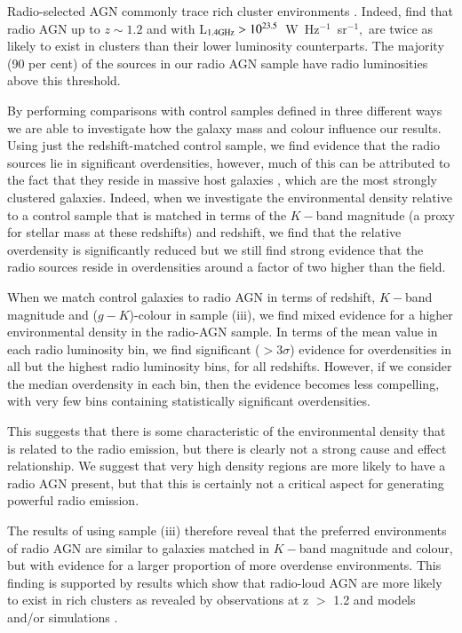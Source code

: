 Radio-selected AGN commonly trace rich cluster environments \citep[e.g.][]{best2007,karouzos2014a}. Indeed, \citet{magliocchetti2018} find that radio AGN up to $z \sim 1.2$ and with L$_{1.4 \rm{GHz} } > 10^{23.5}$~W~Hz$^{-1}$~sr$^{-1},$ are twice as likely to exist in clusters than their lower luminosity counterparts. The majority (90 per cent) of the sources in our radio AGN sample have radio luminosities above this threshold.  

By performing comparisons with control samples defined in three different ways we are able to investigate how the galaxy mass and colour influence our results. Using just the redshift-matched control sample, we find evidence that the radio sources lie in significant overdensities, however, much of this can be attributed to the fact that they reside in massive host galaxies \citep{jarvis2001,mclure2004,seymour2007}, which are the most strongly clustered galaxies. Indeed, when we investigate the environmental density relative to a control sample that is matched in terms of the $K-$band magnitude (a proxy for stellar mass at these redshifts) and redshift, we find that the relative overdensity is significantly reduced but we still find strong evidence that the radio sources reside in overdensities around a factor of two higher than the field.

When we match control galaxies to radio AGN in terms of redshift, $K-$band magnitude and ($g-K$)-colour in sample (iii), we find mixed evidence for a higher environmental density in the radio-AGN sample. In terms of the mean value in each radio luminosity bin, we find significant ($> 3\sigma$) evidence for overdensities in all but the highest radio luminosity bins, for all redshifts. However, if we consider the median overdensity in each bin, then the evidence becomes less compelling, with very few bins containing statistically significant overdensities.

This suggests that there is some characteristic of the environmental density that is related to the radio emission, but there is clearly not a strong cause and effect relationship. We suggest that very high density regions are more likely to have a radio AGN present, but that this is certainly not a critical aspect for generating powerful radio emission.

The results of using sample (iii) therefore reveal that the preferred environments of radio AGN are similar to galaxies matched in $K-$band magnitude and colour, but with evidence for a larger proportion of more overdense environments. This finding is supported by results which show that radio-loud AGN are more likely to exist in rich clusters as revealed by observations at z $>$ 1.2 \citep{hatch2011,wylezalek2013} and models and/or simulations \citep{orsi2016,izquierdo-villalba2018}.

